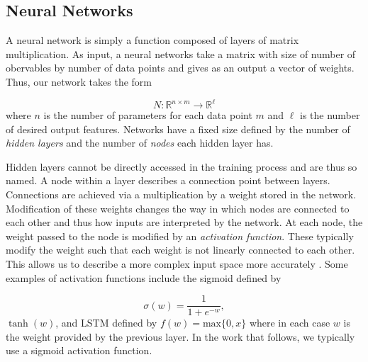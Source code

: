 \documentclass{CUP-JNL-DTM}%
\theoremstyle{definition}
\numberwithin{equation}{section}
\begin{document}

\subsection{Neural Networks}

A neural network is simply a function composed of layers of matrix multiplication. As input, a neural networks take a matrix with size of number of obervables by number of data points and gives as an output a vector of weights. Thus, our network takes the form

\begin{equation}
    N : \mathbb{R}^{n\times m} \rightarrow \mathbb{R}^{\ell}
\end{equation}
where $n$ is the number of parameters for each data point $m$ and $\ell$ is the number of desired output features. Networks have a fixed size defined by the number of \emph{hidden layers} and the number of \emph{nodes} each hidden layer has. 

Hidden layers cannot be directly accessed in the training process and are thus so named. A node within a layer describes a connection point between layers. Connections are achieved via a multiplication by a weight stored in the network. Modification of these weights changes the way in which nodes are connected to each other and thus how inputs are interpreted by the network. At each node, the weight passed to the node is modified by an \emph{activation function}. These typically modify the weight such that each weight is not linearly connected to each other. This allows us to describe a more complex input space more accurately \cite{dubeyActivationFunctionsDeep2022a}. Some examples of activation functions include the sigmoid defined by 

\begin{equation}
    \sigma(w) = \frac{1}{1 + e^{-w}},
\end{equation}
$\tanh(w)$, and LSTM defined by $f(w) = \textrm{max}\{0,x\}$ where in each case $w$ is the weight provided by the previous layer. In the work that follows, we typically use a sigmoid activation function. 
\end{document}
